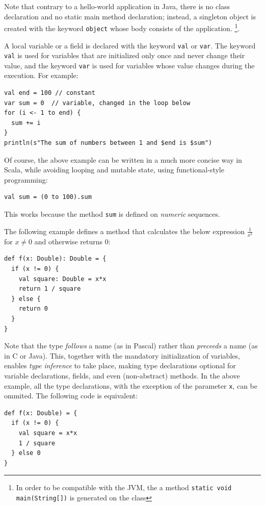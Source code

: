 Note that contrary to a hello-world application in Java, there is no class declaration and no static main method declaration; instead, a singleton object is created with the keyword \texttt{object} whose body consists of the application. \footnote{In order to be compatible with the JVM, the a method \texttt{static void main(String[])} is generated on the class}.

A local variable or a field is declared with the keyword \texttt{val} or \texttt{var}. The keyword \texttt{val} is used for variables that are initialized only once and never change their value, and the keyword \texttt{var} is used for variables whose value changes during the execution. For example:

\begin{lstlisting}
val end = 100 // constant
var sum = 0  // variable, changed in the loop below
for (i <- 1 to end) {
  sum += i
}
println(s"The sum of numbers between 1 and $end is $sum")
\end{lstlisting}

Of course, the above example can be written in a much more concise way in Scala, while avoiding looping and mutable state, using functional-style programming:
\begin{lstlisting}
val sum = (0 to 100).sum
\end{lstlisting} 

This works because the method \texttt{sum} is defined on \emph{numeric} sequences.

The following example defines a method that calculates the below expression \(\frac{1}{x^2}\) for \(x \neq 0\) and otherwise returns \(0\):

\begin{lstlisting}
def f(x: Double): Double = {
  if (x != 0) {
    val square: Double = x*x
    return 1 / square 
  } else {
    return 0
  }
}
\end{lstlisting}

Note that the type \emph{follows} a name (as in Pascal) rather than \emph{preceeds} a name (as in C or Java). This, together with the mandatory initialization of variables, enables \emph{type inference} to take place, making type declarations optional for variable declarations, fields, and even (non-abstract) methods. In the above example, all the type declarations, with the exception of the parameter \texttt{x}, can be ommited. The following code is equivalent:
\begin{lstlisting}
def f(x: Double) = {
  if (x != 0) {
    val square = x*x
    1 / square 
  } else 0
}
\end{lstlisting}

